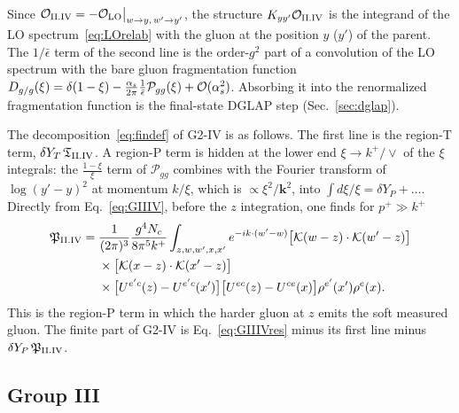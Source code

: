 Since $\mathcal{O}_{\rm II.IV}=-\mathcal{O}_{\rm LO}\big|_{w\to y,\,w'\to y'}$, the structure $K_{yy'}\mathcal{O}_{\rm II.IV}$ is the integrand of the LO spectrum~\eqref{eq:LOrelab} with the gluon at the position $y$ ($y'$) of the parent. The $1/\bar\epsilon$ term of the second line is the order-$g^2$ part of a convolution of the LO spectrum with the bare gluon fragmentation function $D_{g/g}(\xi)=\delta(1-\xi)-\frac{\alpha_s}{2\pi}\frac{1}{\bar\epsilon}\mathcal P_{gg}(\xi)+\mathcal{O}(\alpha_s^2)$. Absorbing it into the renormalized fragmentation function is the final-state DGLAP step (Sec.~\ref{sec:dglap}).

The decomposition~\eqref{eq:findef} of G2-IV is as follows. The first line is the region-T term, $\delta Y_T\,\mathfrak T_{\rm II.IV}$. A region-P term is hidden at the lower end $\xi\to k^+/\vee$ of the $\xi$ integrals: the $\frac{1-\xi}{\xi}$ term of $\mathcal P_{gg}$ combines with the Fourier transform of $\log(y'-y)^2$ at momentum $k/\xi$, which is $\propto\xi^2/\mathbf k^2$, into $\int d\xi/\xi=\delta Y_P+\dots$. Directly from Eq.~\eqref{eq:GIIIV}, before the $z$ integration, one finds for $p^+\gg k^+$
\begin{align}
\mathfrak P_{\rm II.IV}={}&\frac{1}{(2\pi)^3}\frac{g^4N_c}{8\pi^5k^+}\int_{z,w,w',x,x'}e^{-ik\cdot(w'-w)}\big[\mathcal{K}(w-z)\cdot\mathcal{K}(w'-z)\big]\notag\\
&\times\big[\mathcal{K}(x-z)\cdot\mathcal{K}(x'-z)\big]\notag\\
&\times\big[U^{e'c}(z)-U^{e'c}(x')\big]\big[U^{ec}(z)-U^{ce}(x)\big]\rho^{e'}(x')\rho^e(x).
\label{eq:PIIIV}
\end{align}
This is the region-P term in which the harder gluon at $z$ emits the soft measured gluon. The finite part of G2-IV is Eq.~\eqref{eq:GIIIVres} minus its first line minus $\delta Y_P\,\mathfrak P_{\rm II.IV}$.

\subsection{Group III}\label{sec:finiteG3}

